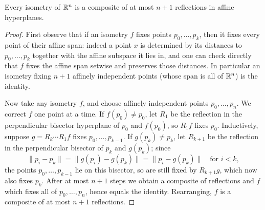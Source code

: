 \documentclass[a4paper]{scrartcl}
\begin{document}
\begin{theorem}
    Every isometry of $\mathbb{R}^n$ is a composite of at most $n + 1$ reflections in affine hyperplanes.
\end{theorem}
\begin{proof}
    First observe that if an isometry $f$ fixes points $p_0, \dots, p_k$, then it fixes every point of their affine span: indeed a point $x$ is determined by its distances to $p_0, \dots, p_k$ together with the affine subspace it lies in, and one can check directly that $f$ fixes the affine span setwise and preserves those distances. In particular an isometry fixing $n + 1$ affinely independent points (whose span is all of $\mathbb{R}^n$) is the identity.

    Now take any isometry $f$, and choose affinely independent points $p_0, \dots, p_n$. We correct $f$ one point at a time. If $f(p_0) \neq p_0$, let $R_1$ be the reflection in the perpendicular bisector hyperplane of $p_0$ and $f(p_0)$, so $R_1 f$ fixes $p_0$. Inductively, suppose $g = R_k \cdots R_1 f$ fixes $p_0, \dots, p_{k-1}$. If $g(p_k) \neq p_k$, let $R_{k+1}$ be the reflection in the perpendicular bisector of $p_k$ and $g(p_k)$; since
    $$
    \|p_i - p_k\| = \|g(p_i) - g(p_k)\| = \|p_i - g(p_k)\| \quad \text{for } i < k,
    $$
    the points $p_0, \dots, p_{k-1}$ lie on this bisector, so are still fixed by $R_{k+1} g$, which now also fixes $p_k$. After at most $n+1$ steps we obtain a composite of reflections and $f$ which fixes all of $p_0, \dots, p_n$, hence equals the identity. Rearranging, $f$ is a composite of at most $n + 1$ reflections.
\end{proof}
\end{document}
